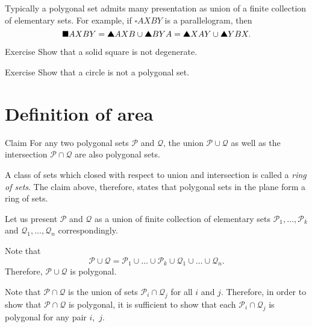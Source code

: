Typically a polygonal set admits many 
presentation as union of a finite collection of elementary sets.
For example, if $\square AXBY$ is a parallelogram, then
\[\solidsquare AXBY=\solidtriangle AXB\cup \solidtriangle BYA=\solidtriangle XAY\cup \solidtriangle YBX.\]

\begin{thm}{Exercise}\label{ex:solid-square}
Show that a solid square is not degenerate.
\end{thm}

\begin{thm}{Exercise}\label{ex:poly-circ}
Show that a circle is not a polygonal set.
\end{thm}



\section*{Definition of area}

\begin{thm}{Claim}\label{clm:poly-ring}
For any two polygonal sets $\mathcal{P}$ and $\mathcal{Q}$,
the union $\mathcal{P}\cup\mathcal{Q}$ 
as well as the intersection $\mathcal{P}\cap\mathcal{Q}$ 
are also polygonal sets.
\end{thm}

A class of sets which closed with respect to union and intersection  is called a {}\emph{ring of sets}.
The claim above, therefore, states that polygonal sets in the plane form a ring of sets.

Let us present $\mathcal{P}$ and $\mathcal{Q}$
as a union of finite collection of elementary sets $\mathcal{P}_1,\dots,\mathcal{P}_k$ 
and $\mathcal{Q}_1,\dots,\mathcal{Q}_n$ correspondingly.

Note that
\[\mathcal{P}\cup\mathcal{Q}
=
\mathcal{P}_1
\cup
\dots
\cup
\mathcal{P}_k
\cup
\mathcal{Q}_1
\cup
\dots
\cup
\mathcal{Q}_n.\]
Therefore, $\mathcal{P}\cup\mathcal{Q}$ is polygonal.



Note that $\mathcal{P}\cap \mathcal{Q}$ is the union of sets $\mathcal{P}_i\cap \mathcal{Q}_j$ for all $i$ and $j$.
Therefore, in order to show that $\mathcal{P}\cap \mathcal{Q}$ is polygonal,
it is sufficient to show that each $\mathcal{P}_i\cap \mathcal{Q}_j$ is polygonal for any pair $i$,~$j$.

